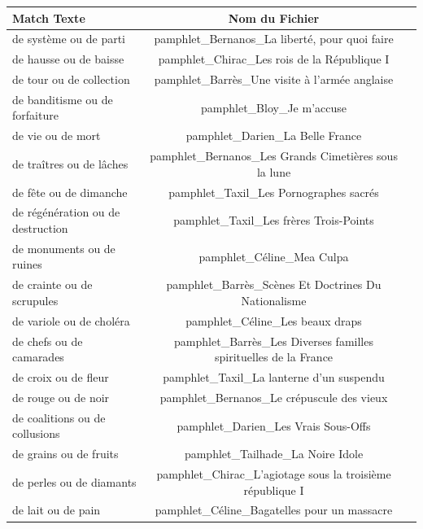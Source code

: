 \begin{longtable}{| p{12.5cm}| c | c| }
    \centering
        \textbf{Match Texte} & \textbf{Nom du Fichier} \\
        \hline
        de système ou de parti & pamphlet\_Bernanos\_La liberté, pour quoi faire \\
        \hline
        de hausse ou de baisse & pamphlet\_Chirac\_Les rois de la République I \\
        \hline
        de tour ou de collection & pamphlet\_Barrès\_Une visite à l’armée anglaise \\
        \hline
        de banditisme ou de forfaiture & pamphlet\_Bloy\_Je m’accuse \\
        \hline
        de vie ou de mort & pamphlet\_Darien\_La Belle France \\
        \hline
        de traîtres ou de lâches & pamphlet\_Bernanos\_Les Grands Cimetières sous la lune \\
        \hline
        de fête ou de dimanche & pamphlet\_Taxil\_Les Pornographes sacrés \\
        \hline
        de régénération ou de destruction & pamphlet\_Taxil\_Les frères Trois-Points \\
        \hline
        de monuments ou de ruines & pamphlet\_Céline\_Mea Culpa \\
        \hline
        de crainte ou de scrupules & pamphlet\_Barrès\_Scènes Et Doctrines Du Nationalisme \\
        \hline
        de variole ou de choléra & pamphlet\_Céline\_Les beaux draps \\
        \hline
        de chefs ou de camarades & pamphlet\_Barrès\_Les Diverses familles spirituelles de la France \\
        \hline
        de croix ou de fleur & pamphlet\_Taxil\_La lanterne d’un suspendu \\
        \hline
        de rouge ou de noir & pamphlet\_Bernanos\_Le crépuscule des vieux \\
        \hline
        de coalitions ou de collusions & pamphlet\_Darien\_Les Vrais Sous-Offs \\
        \hline
        de grains ou de fruits & pamphlet\_Tailhade\_La Noire Idole \\
        \hline
        de perles ou de diamants & pamphlet\_Chirac\_L'agiotage sous la troisième république I \\
        \hline
        de lait ou de pain & pamphlet\_Céline\_Bagatelles pour un massacre \\

\end{longtable}
